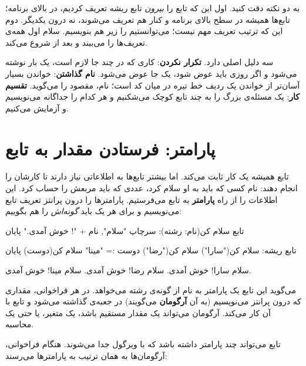 به دو نکته دقت کنید. اول این که تابع را \emph{بیرون} تابع ریشه تعریف
کردیم، در بالای برنامه؛ تابع‌ها همیشه در سطح بالای برنامه و کنار هم
تعریف می‌شوند، نه درون یکدیگر. دوم این که ترتیب تعریف مهم نیست؛ می‌توانستیم
 را زیر  هم بنویسیم. سلام اول همه‌ی
تعریف‌ها را می‌بیند و بعد از  شروع می‌کند.

\begin{note}
سه دلیل اصلی دارد. \textbf{تکرار نکردن}: کاری که در چند جا لازم است، یک بار
نوشته می‌شود و اگر روزی باید عوض شود، یک جا عوض می‌شود. \textbf{نام
گذاشتن}: خواندن  بسیار آسان‌تر از خواندن یک ردیف خط
تیره در میان کد است؛ نام، مقصود را می‌گوید.
\textbf{تقسیم کار}: یک مسئله‌ی بزرگ را به چند تابع کوچک می‌شکنیم و هر
کدام را جداگانه می‌نویسیم و آزمایش می‌کنیم.
\end{note}

\section{پارامتر: فرستادن مقدار به تابع}

تابع  همیشه یک کار ثابت می‌کند. اما بیشتر تابع‌ها به
اطلاعاتی نیاز دارند تا کارشان را انجام دهند: نام کسی که باید به او سلام
کرد، عددی که باید مربعش را حساب کرد. این اطلاعات را از راه
\textbf{پارامتر} به تابع می‌فرستیم. پارامترها را درون پرانتز تعریف تابع
می‌نویسیم و برای هر یک باید \emph{گونه‌اش} را هم بگوییم:

\begin{salamfa}
تابع سلام کن(نام: رشته):
    سرچاپ "سلام", نام + "! خوش آمدی."
پایان

تابع ریشه:
    سلام کن("سارا")
    سلام کن("رضا")
    دوست := "مینا"
    سلام کن(دوست)
پایان
\end{salamfa}

\begin{outputfa}
سلام سارا! خوش آمدی.
سلام رضا! خوش آمدی.
سلام مینا! خوش آمدی.
\end{outputfa}

 می‌گوید این تابع یک پارامتر به نام  از گونه‌ی
رشته می‌خواهد. در هر فراخوانی، مقداری که درون پرانتز می‌نویسیم (به آن
\textbf{آرگومان} می‌گویند) در جعبه‌ی  گذاشته می‌شود و تابع با
آن کار می‌کند. آرگومان می‌تواند یک مقدار مستقیم باشد، یک متغیر، یا حتی
یک محاسبه.

تابع می‌تواند چند پارامتر داشته باشد که با ویرگول جدا می‌شوند. هنگام
فراخوانی، آرگومان‌ها به همان ترتیب به پارامترها می‌رسند:

